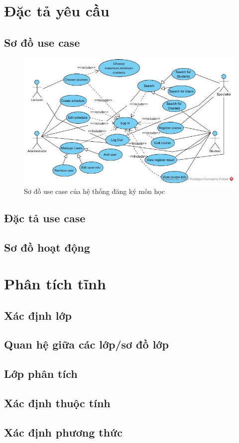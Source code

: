 \documentclass{article}
\begin{document}
\section{Đặc tả yêu cầu}

  \subsection{Sơ đồ use case}
    \begin{figure}[!ht]
      \centering
      \includegraphics[scale=0.4]{../pictures/projectdiagrams/usecasediagram.jpg}
      \caption{Sơ đồ use case của hệ thống đăng ký môn học}
    \end{figure}

  \subsection{Đặc tả use case}

  \subsection{Sơ đồ hoạt động}

\section{Phân tích tĩnh}

  \subsection{Xác định lớp}

  \subsection{Quan hệ giữa các lớp/sơ đồ lớp}

  \subsection{Lớp phân tích}

  \subsection{Xác định thuộc tính}

  \subsection{Xác định phương thức}

\section{}
\end{document}
